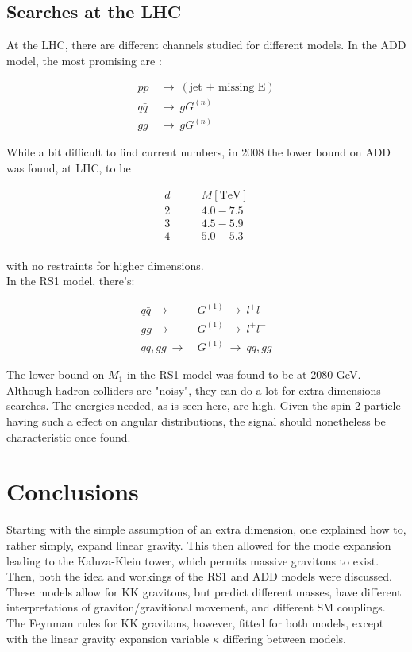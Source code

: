 \documentclass[11pt,a4paper]{article}
\begin{document}
\subsection{Searches at the LHC}
At the LHC, there are different channels studied for different models. In the ADD model, the most promising are \cite{K}:

\begin{align*}
	pp\:&\rightarrow\:(\text{jet + missing E})\\
	q\bar{q} \:&\rightarrow\: gG^{(n)}\\
	gg\:&\rightarrow\: gG^{(n)}
\end{align*}

While a bit difficult to find current numbers, in 2008 the lower bound on ADD was found, at LHC, to be

\begin{align*}
	d \quad & \quad M [\text{TeV}]\\
	2 \quad & \quad 4.0-7.5\\
	3 \quad & \quad 4.5-5.9\\
	4 \quad & \quad 5.0-5.3\\
\end{align*}

with no restraints for higher dimensions.\\
In the RS1 model, there's:

\begin{align*}
	q\bar{q}\:\rightarrow\:& G^{(1)}\:\rightarrow\:l^+l^-\\
	gg \:\rightarrow\:& G^{(1)} \:\rightarrow\: l^+l^-\\
	q\bar{q},gg \:\rightarrow\:& G^{(1)} \:\rightarrow\: q\bar{q},gg
\end{align*}

The lower bound on $M_1$ in the RS1 model was found to be at 2080 GeV.\\

Although hadron colliders are "noisy", they can do a lot for extra dimensions searches. The energies needed, as is seen here, are high. Given the spin-2 particle having such a effect on angular distributions, the signal should nonetheless be characteristic once found.

\newpage

\section{Conclusions}
Starting with the simple assumption of an extra dimension, one explained how to, rather simply, expand linear gravity. This then allowed for the mode expansion leading to the Kaluza-Klein tower, which permits massive gravitons to exist. Then, both the idea and workings of the RS1 and ADD models were discussed. These models allow for KK gravitons, but predict different masses, have different interpretations of graviton/gravitional movement, and different SM couplings. The Feynman rules for KK gravitons, however, fitted for both models, except with the linear gravity expansion variable $\kappa$ differing between models.\\
\end{document}
